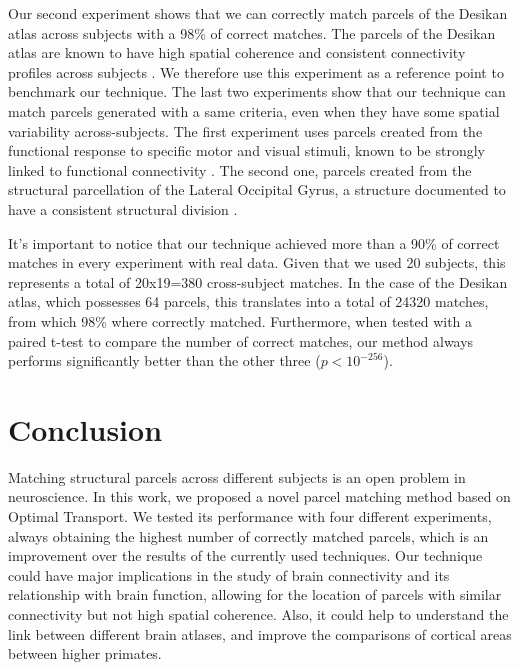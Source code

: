 Our second experiment shows that we can correctly match parcels of the Desikan atlas across subjects with a 98\% of correct matches. The parcels of the Desikan atlas are known to have high spatial coherence and consistent connectivity profiles across subjects \cite{DeReus2013}. We therefore use this experiment as a reference point to benchmark our technique.
The last two experiments show that our technique can match parcels generated with a same criteria, even when they have some spatial variability across-subjects. The first experiment uses parcels created from the functional response to specific motor and visual stimuli, known to be strongly linked to functional connectivity \cite{Osher2016, Penfield1954}. The second one, parcels created from the structural parcellation of the Lateral Occipital Gyrus, a structure documented to have a consistent structural division \cite{ThiebautdeSchotten2016, Gallardo2017a}. 

It's important to notice that our technique achieved more than a 90\% of correct matches in every experiment with real data. Given that we used 20 subjects, this represents a total of 20x19=380 cross-subject matches. In the case of the Desikan atlas, which possesses 64 parcels, this translates into a total of 24320 matches, from which 98\% where correctly matched. Furthermore, when tested with a paired t-test to compare the number of correct matches, our method always performs significantly better than the other three ($p<10^{-256}$).


\section{Conclusion}
Matching structural parcels across different subjects is an open problem in
neuroscience. In this work, we proposed a novel parcel matching method based on
Optimal Transport. We tested its performance with four different experiments,
always obtaining the highest number of correctly matched parcels, which is an
improvement over the results of the currently used techniques. Our technique 
could have major implications in the study of brain connectivity and its
relationship with brain function, allowing for the location of parcels with
similar connectivity but not high spatial coherence. Also, it could help to
understand the link between different brain atlases, and improve the 
comparisons of cortical areas between higher primates.


\chapterbib
